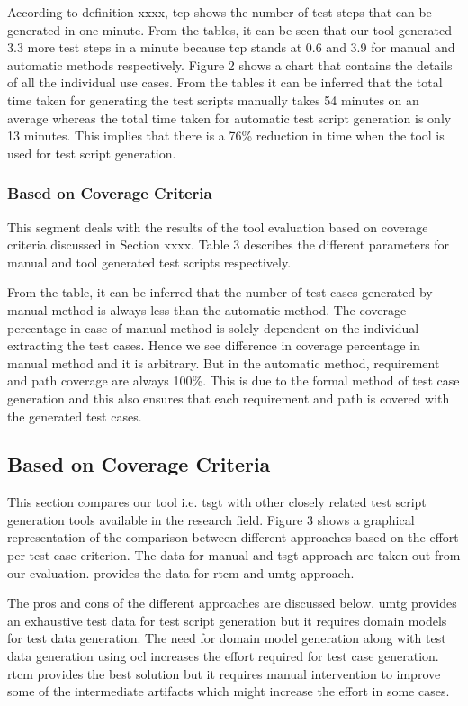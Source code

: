 According to definition xxxx, \gls{tcp} shows the number of test steps that can be generated in one minute. From the tables, it can be seen that our tool generated 3.3 more test steps in a minute because \gls{tcp} stands at 0.6 and 3.9 for manual and automatic methods respectively. Figure 2 shows a chart that contains the details of all the individual use cases.
From the tables it can be inferred that the total time taken for generating the test scripts manually takes 54 minutes on an average whereas the total time taken for automatic test script generation is only 13 minutes. This implies that there is a 76\% reduction in time when the tool is used for test script generation.

\subsubsection{Based on Coverage Criteria}

This segment deals with the results of the tool evaluation based on coverage criteria discussed in Section xxxx. Table 3 describes the different parameters for manual and tool generated test scripts respectively.

From the table, it can be inferred that the number of test cases generated by manual method is always less than the automatic method. The coverage percentage in case of manual method is solely dependent on the individual extracting the test cases. Hence we see difference in coverage percentage in manual method and it is arbitrary. But in the automatic method, requirement and path coverage are always 100\%. This is due to the formal method of test case generation and this also ensures that each requirement and path is covered with the generated test cases. 

\subsection{Based on Coverage Criteria}
This section compares our tool i.e. \gls{tsgt} with other closely related test script generation tools available in the research field. Figure 3 shows a graphical representation of the comparison between different approaches based on the effort per test case criterion. The data for manual and \gls{tsgt} approach are taken out from our evaluation. \cite{yue2015rtcm}provides the data for \gls{rtcm} and \gls{umtg} approach.

The pros and cons of the different approaches are discussed below. \gls{umtg} provides an exhaustive test data for test script generation but it requires domain models for test data generation. The need for domain model generation along with test data generation using \gls{ocl} increases the effort required for test case generation. \gls{rtcm} provides the best solution but it requires manual intervention to improve some of the intermediate artifacts which might increase the effort in some cases. 

